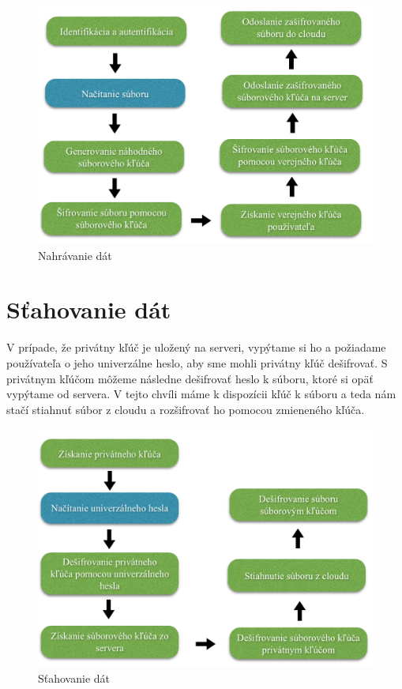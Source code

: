 		\begin{figure}[H]
			\begin{center}
				\includegraphics[width=1\linewidth]{images/nahravanie.png}
				\caption{Nahrávanie dát}
			\end{center}
		\end{figure}
				
	\section{Sťahovanie dát}
	
		V prípade, že privátny kľúč je uložený na serveri, vypýtame si ho a požiadame používateľa o jeho univerzálne heslo, aby sme mohli privátny kľúč dešifrovať. S privátnym kľúčom môžeme následne dešifrovať heslo k súboru, ktoré si opäť vypýtame od servera. V tejto chvíli máme k dispozícii kľúč k súboru a teda nám stačí stiahnuť súbor z cloudu a rozšifrovať ho pomocou zmieneného kľúča. 
		
		\begin{figure}[H]
			\begin{center}
				\includegraphics[width=1\linewidth]{images/stahovanie.png}
				\caption{Sťahovanie dát}
			\end{center}
		\end{figure}	
		
